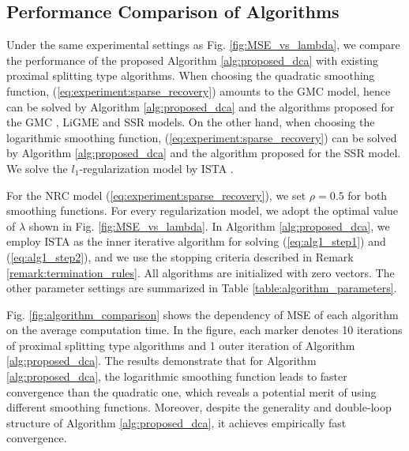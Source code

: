\documentclass[lettersize,journal]{IEEEtran}
\theoremstyle{plain}%
\theoremstyle{definition}
\theoremstyle{remark}
\begin{document}
%


\subsection{Performance Comparison of Algorithms}
\label{sec:comparison_of_algorithms}
Under the same experimental settings as Fig. \ref{fig:MSE_vs_lambda}, we compare the performance of the proposed Algorithm \ref{alg:proposed_dca} with existing proximal splitting type algorithms. When choosing the quadratic smoothing function, (\ref{eq:experiment:sparse_recovery}) amounts to the GMC model, hence can be solved by Algorithm \ref{alg:proposed_dca} and the algorithms proposed for the GMC \cite{selesnick2017}, LiGME \cite{abe2020} and SSR \cite{alshabili2021} models. On the other hand, when choosing the logarithmic smoothing function, (\ref{eq:experiment:sparse_recovery}) can be solved by Algorithm \ref{alg:proposed_dca} and the algorithm proposed for the SSR \cite{alshabili2021} model. We solve the $l_1$-regularization model by ISTA \cite{combettes2005,beck2009}. 

For the NRC model (\ref{eq:experiment:sparse_recovery}), we set $\rho=0.5$ for both smoothing functions. For every regularization model, we adopt the optimal value of $\lambda$ shown in Fig. \ref{fig:MSE_vs_lambda}. In Algorithm \ref{alg:proposed_dca}, we employ ISTA \cite{combettes2005,beck2009} as the inner iterative algorithm for solving (\ref{eq:alg1_step1}) and (\ref{eq:alg1_step2}), and we use the stopping criteria described in Remark \ref{remark:termination_rules}. All algorithms are initialized with zero vectors. The other parameter settings are summarized in Table \ref{table:algorithm_parameters}.

Fig. \ref{fig:algorithm_comparison} shows the dependency of MSE of each algorithm on the average computation time. In the figure, each marker denotes 10 iterations of proximal splitting type algorithms and 1 outer iteration of Algorithm \ref{alg:proposed_dca}. The results demonstrate that for Algorithm \ref{alg:proposed_dca}, the logarithmic smoothing function leads to faster convergence than the quadratic one, which reveals a potential merit of using different smoothing functions. Moreover, despite the generality and double-loop structure of Algorithm \ref{alg:proposed_dca}, it achieves empirically fast convergence. 
\end{document}
